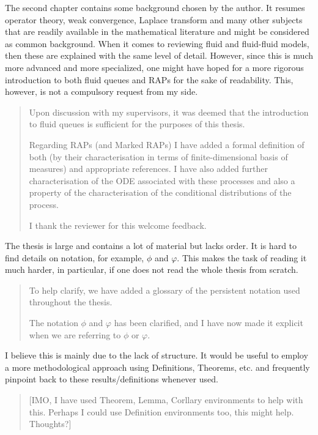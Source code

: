 \documentclass[a4paper]{article}
\begin{document}
The second chapter contains some background chosen by the author. It resumes operator theory, weak convergence, Laplace transform and many other subjects that are
readily available in the mathematical literature and might be considered as common
background. When it comes to reviewing fluid and fluid-fluid models, then these are
explained with the same level of detail. However, since this is much more advanced
and more specialized, one might have hoped for a more rigorous introduction to both
fluid queues and RAPs for the sake of readability. This, however, is not a compulsory
request from my side.
\begin{quote}
    Upon discussion with my supervisors, it was deemed that the introduction to fluid queues is sufficient for the purposes of this thesis.

    Regarding RAPs (and Marked RAPs) I have added a formal definition of both (by their characterisation in terms of finite-dimensional basis of measures) and appropriate references. I have also added further characterisation of the ODE associated with these processes and also a property of the characterisation of the conditional distributions of the process. 

    I thank the reviewer for this welcome feedback. 
\end{quote}

The thesis is large and contains a lot of material but lacks order. It is hard to find
details on notation, for example, \(\phi\) and \(\varphi\). This makes the task of reading it much
harder, in particular, if one does not read the whole thesis from scratch.
\begin{quote}
    To help clarify, we have added a glossary of the persistent notation used throughout the thesis. 

    The notation \(\phi\) and \(\varphi\) has been clarified, and I have now made it explicit when we are referring to \(\phi\) or \(\varphi\). 
\end{quote}

I believe this is mainly due to the lack of structure. It would be useful to employ
a more methodological approach using Definitions, Theorems, etc. and frequently
pinpoint back to these results/definitions whenever used.
\begin{quote}
    [IMO, I have used Theorem, Lemma, Corllary environments to help with this. Perhaps I could use Definition environments too, this might help. Thoughts?]
\end{quote}
\end{document}
